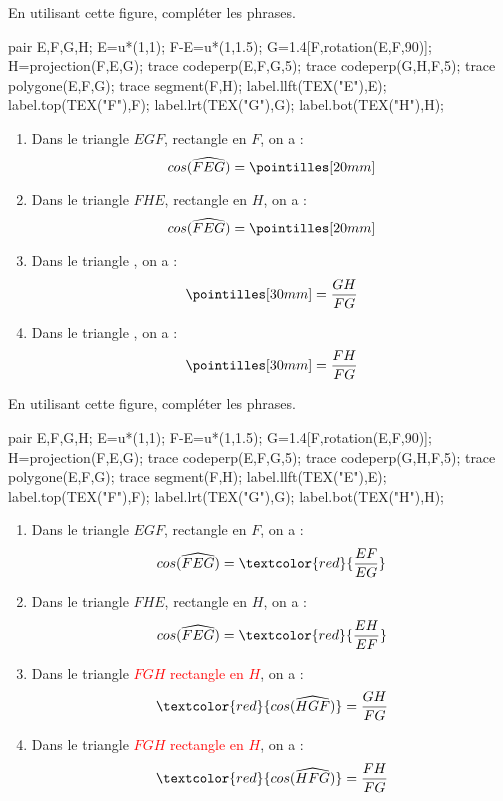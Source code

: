 \begin{exercice*}
    En utilisant cette figure, compléter les phrases.
    \begin{center}
        \begin{Geometrie}
            pair E,F,G,H;
            E=u*(1,1);
            F-E=u*(1,1.5);
            G=1.4[F,rotation(E,F,90)];
            H=projection(F,E,G);
            trace codeperp(E,F,G,5);
            trace codeperp(G,H,F,5);
            trace polygone(E,F,G);
            trace segment(F,H);
            label.llft(TEX("E"),E);
            label.top(TEX("F"),F);
            label.lrt(TEX("G"),G);
            label.bot(TEX("H"),H);
        \end{Geometrie}
    \end{center}
    \begin{enumerate}
        \item Dans le triangle $EGF$, rectangle en $F$, on a : $$cos(\widehat{FEG})=\pointilles[20mm]$$
        \item Dans le triangle $FHE$, rectangle en $H$, on a : $$cos(\widehat{FEG})=\pointilles[20mm]$$
        \item Dans le triangle \pointilles[40mm], on a : $$\pointilles[30mm]=\dfrac{GH}{FG}$$
        \item Dans le triangle \pointilles[40mm], on a : $$\pointilles[30mm]=\dfrac{FH}{FG}$$
    \end{enumerate}
\end{exercice*}
\begin{corrige}
    En utilisant cette figure, compléter les phrases.

    \begin{Geometrie}
        pair E,F,G,H;
        E=u*(1,1);
        F-E=u*(1,1.5);
        G=1.4[F,rotation(E,F,90)];
        H=projection(F,E,G);
        trace codeperp(E,F,G,5);
        trace codeperp(G,H,F,5);
        trace polygone(E,F,G);
        trace segment(F,H);
        label.llft(TEX("E"),E);
        label.top(TEX("F"),F);
        label.lrt(TEX("G"),G);
        label.bot(TEX("H"),H);
    \end{Geometrie}

    \begin{enumerate}
        \item Dans le triangle $EGF$, rectangle en $F$, on a : $$cos(\widehat{FEG})=\textcolor{red}{\dfrac{EF}{EG}}$$
        \item Dans le triangle $FHE$, rectangle en $H$, on a : $$cos(\widehat{FEG})=\textcolor{red}{\dfrac{EH}{EF}}$$
        \item Dans le triangle \textcolor{red}{$FGH$ rectangle en $H$}, on a : $$\textcolor{red}{cos(\widehat{HGF})}=\dfrac{GH}{FG}$$
    \end{enumerate}
    \Coupe
    \begin{enumerate}
        \setcounter{enumi}{3}
        \item Dans le triangle \textcolor{red}{$FGH$ rectangle en $H$}, on a : $$\textcolor{red}{cos(\widehat{HFG})}=\dfrac{FH}{FG}$$
    \end{enumerate}
\end{corrige}

